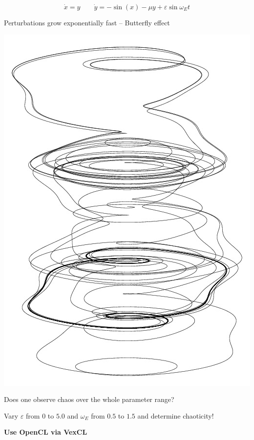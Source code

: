 \begin{frame}[fragile]
 

 $$
  \dot{x} = y \quad \quad \dot{y} = - \sin(x) - \mu y + \varepsilon \sin \omega_E t 
 $$

\vspace{2ex}
Perturbations grow exponentially fast -- Butterfly effect

\vspace{3ex}
\begin{minipage}{0.48\textwidth} \begin{center}
\centerline{\includegraphics[draft=false,angle=270,width=1.0\textwidth]{pendulum2.jpg}}
\end{center}\end{minipage}\begin{minipage}{0.48\textwidth}\begin{center}
Does one observe chaos over the whole parameter range?

\vspace{2ex}
Vary $\varepsilon$ from $0$ to $5.0$ and $\omega_E$ from $0.5$ to $1.5$ and determine chaoticity!
\end{center}\end{minipage}

\vspace{2ex}
\centerline{\bf Use OpenCL via VexCL}

\end{frame}
